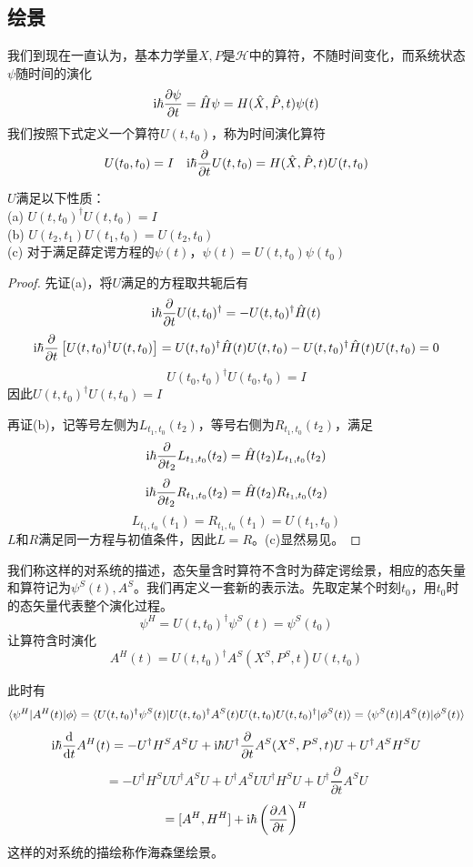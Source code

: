 \subsection{绘景}
我们到现在一直认为，基本力学量$X,P$是$\mathcal{H}$中的算符，不随时间变化，而系统状态$\psi$随时间的演化
$$\mathrm{i}\hbar\frac{\partial\psi}{\partial t}=\hat{H}\psi=H(\hat{X},\hat{P},t)\psi(t)$$
我们按照下式定义一个算符$U(t,t_0)$，称为时间演化算符
$$U(t_0,t_0)=I\quad\mathrm{i}\hbar\frac{\partial}{\partial t}U(t,t_0)=H(\hat{X},\hat{P},t)U(t,t_0)$$
\begin{theorem}
    $U$满足以下性质：\\
    (a) $U(t,t_0)^\dagger U(t,t_0)=I$\\
    (b) $U(t_2,t_1)U(t_1,t_0)=U(t_2,t_0)$\\
    (c) 对于满足薛定谔方程的$\psi(t)$，$\psi(t)=U(t,t_0)\psi(t_0)$
\end{theorem}
\begin{proof}
    先证(a)，将$U$满足的方程取共轭后有
    $$\mathrm{i}\hbar\frac{\partial}{\partial t}U(t,t_0)^\dagger=-U(t,t_0)^\dagger\hat{H}(t)$$
    $$\mathrm{i}\hbar\frac{\partial}{\partial t}\left[U(t,t_0)^\dagger U(t,t_0)\right]=U(t,t_0)^\dagger \hat{H}(t)U(t,t_0)-U(t,t_0)^\dagger \hat{H}(t)U(t,t_0)=0$$
    $$U(t_0,t_0)^\dagger U(t_0,t_0)=I$$
    因此$U(t,t_0)^\dagger U(t,t_0)=I$

    再证(b)，记等号左侧为$L_{t_1,t_0}(t_2)$，等号右侧为$R_{t_1,t_0}(t_2)$，满足
    $$\mathrm{i}\hbar\frac{\partial}{\partial t_2}L_{t_1,t_0}(t_2)=\hat{H}(t_2)L_{t_1,t_0}(t_2)$$
    $$\mathrm{i}\hbar\frac{\partial}{\partial t_2}R_{t_1,t_0}(t_2)=\hat{H}(t_2)R_{t_1,t_0}(t_2)$$
    $$ L_{t_1,t_0}(t_1)=R_{t_1,t_0}(t_1)=U(t_1,t_0)$$
    $L$和$R$满足同一方程与初值条件，因此$L=R$。(c)显然易见。
\end{proof}

我们称这样的对系统的描述，态矢量含时算符不含时为薛定谔绘景，相应的态矢量和算符记为$\psi^S(t),A^S$。我们再定义一套新的表示法。先取定某个时刻$t_0$，用$t_0$时的态矢量代表整个演化过程。
$$\psi^H=U(t,t_0)^\dagger \psi^S(t)=\psi^S(t_0)$$
让算符含时演化
$$A^H(t)=U(t,t_0)^\dagger A^S(X^S,P^S,t)U(t,t_0)$$

此时有
$$\braket{\psi^H|A^H(t)|\phi}=\braket{U(t,t_0)^\dagger\psi^S(t)|U(t,t_0)^\dagger A^S(t)U(t,t_0)U(t,t_0)^\dagger|\phi^S(t)}=\braket{\psi^S(t)|A^S(t)|\phi^S(t)}$$
$$\mathrm{i}\hbar\frac{\mathrm{d}}{\mathrm{d} t}A^H(t)=-U^\dagger H^S A^SU+\mathrm{i}\hbar U^\dagger \frac{\partial}{\partial t}A^S(X^S,P^S,t)U+U^\dagger A^S H^SU$$
$$=-U^\dagger H^SUU^\dagger A^SU+U^\dagger A^SUU^\dagger H^SU+U^\dagger\frac{\partial}{\partial t}A^S U$$
$$=[A^H,H^H]+\mathrm{i}\hbar\left(\frac{\partial A}{\partial t}\right)^H$$
这样的对系统的描绘称作海森堡绘景。

